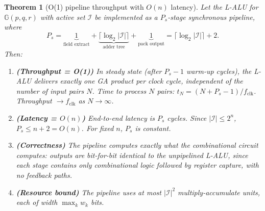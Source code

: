 \documentclass[11pt,a4paper]{article}
\theoremstyle{definition}
\theoremstyle{plain}
\newtheorem{theorem}{Theorem}[section]
\theoremstyle{remark}
\newcommand{\GA}{\mathbb{G}}
\begin{document}
\begin{theorem}[O(1) pipeline throughput with $O(n)$ latency]
\label{thm:pipeline}
Let the L-ALU for $\GA(p,q,r)$ with active set $\mathcal{I}$ be
implemented as a $P_s$-stage synchronous pipeline, where
\begin{equation}\label{eq:pipe-stages}
  P_s = \underbrace{1}_{\text{field extract}} +
        \underbrace{\lceil\log_2|\mathcal{I}|\rceil}_{\text{adder tree}} +
        \underbrace{1}_{\text{pack output}}
      = \lceil\log_2|\mathcal{I}|\rceil + 2.
\end{equation}
Then:
\begin{enumerate}
  \item \textbf{(Throughput = O(1))} In steady state (after $P_s-1$ warm-up
        cycles), the L-ALU delivers \emph{exactly one GA product per clock
        cycle}, independent of the number of input pairs $N$.
        Time to process $N$ pairs: $t_N = (N+P_s-1)/f_\mathrm{clk}$.
        Throughput $\to f_\mathrm{clk}$ as $N\to\infty$.
  \item \textbf{(Latency = $O(n)$)} End-to-end latency is $P_s$ cycles.
        Since $|\mathcal{I}|\le 2^n$,
        $P_s\le n+2 = O(n)$.
        For fixed $n$, $P_s$ is constant.
  \item \textbf{(Correctness)} The pipeline computes exactly what the
        combinational circuit computes: outputs are bit-for-bit identical
        to the unpipelined L-ALU, since each stage contains only
        combinational logic followed by register capture, with no
        feedback paths.
  \item \textbf{(Resource bound)} The pipeline uses at most
        $|\mathcal{I}|^2$ multiply-accumulate units, each of width
        $\max_k w_k$ bits.
\end{enumerate}
\end{theorem}
\end{document}
